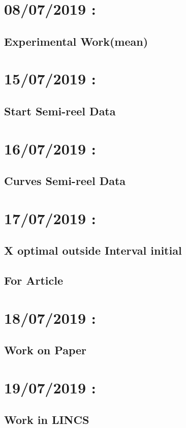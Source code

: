 \documentclass[a4paper,10pt]{article}
\begin{document}
  	\section{08/07/2019 :}
  		\subsection{Experimental Work(mean)}
  			
\clearpage

  	
  	\section{15/07/2019 :}
  		\subsection{Start Semi-reel Data}
  			
  			
  	\section{16/07/2019 :}
  		\subsection{Curves Semi-reel Data}
  			
  	
  	\section{17/07/2019 :}
  		\subsection{X optimal outside Interval initial}
  			
  			
  		\subsection{For Article}
  			
  			
  	\section{18/07/2019 :}
  		\subsection{Work on Paper}
  			
  			
  	\section{19/07/2019 :}
  		\subsection{Work in LINCS}
  			

\clearpage


\end{document}
